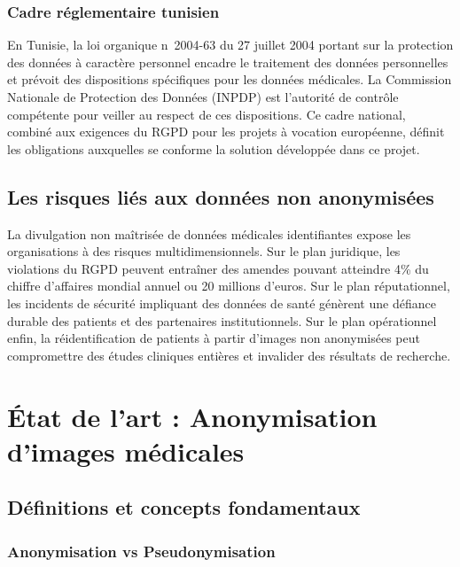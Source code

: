 \subsubsection{Cadre réglementaire tunisien}

En Tunisie, la loi organique n\textdegree~2004-63 du 27 juillet 2004 portant sur la protection des données à caractère personnel encadre le traitement des données personnelles et prévoit des dispositions spécifiques pour les données médicales. La Commission Nationale de Protection des Données (INPDP) est l'autorité de contrôle compétente pour veiller au respect de ces dispositions. Ce cadre national, combiné aux exigences du RGPD pour les projets à vocation européenne, définit les obligations auxquelles se conforme la solution développée dans ce projet.

\subsection{Les risques liés aux données non anonymisées}

La divulgation non maîtrisée de données médicales identifiantes expose les organisations à des risques multidimensionnels. Sur le plan juridique, les violations du RGPD peuvent entraîner des amendes pouvant atteindre 4\% du chiffre d'affaires mondial annuel ou 20 millions d'euros. Sur le plan réputationnel, les incidents de sécurité impliquant des données de santé génèrent une défiance durable des patients et des partenaires institutionnels. Sur le plan opérationnel enfin, la réidentification de patients à partir d'images non anonymisées peut compromettre des études cliniques entières et invalider des résultats de recherche.

\section{État de l'art : Anonymisation d'images médicales}

\subsection{Définitions et concepts fondamentaux}

\subsubsection{Anonymisation vs Pseudonymisation}

